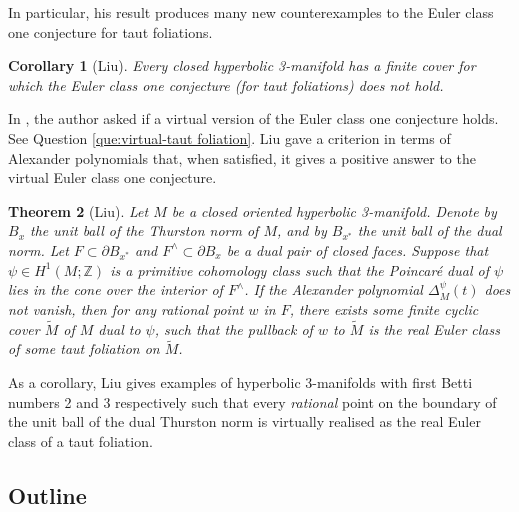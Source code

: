\documentclass[11pt]{amsart}
\newtheorem{thm}{Theorem}[section]
\newtheorem{cor}[thm]{Corollary}
\theoremstyle{remark}
\theoremstyle{definition}
\begin{document}
	In particular, his result produces many new counterexamples to the Euler class one conjecture for taut foliations.  
	
	\begin{cor}[Liu]
		Every closed hyperbolic 3-manifold has a finite cover for which the Euler class one conjecture (for taut foliations) does not hold. 
		\label{cor:Liu-taut-foliation}
	\end{cor} 

	In \cite{yazdi2020thurston}, the author asked if a virtual version of the Euler class one conjecture holds. See Question \ref{que:virtual-taut foliation}. Liu \cite{liu2024criterion} gave a criterion in terms of Alexander polynomials that, when satisfied, it gives a positive answer to the virtual Euler class one conjecture. 
	
	\begin{thm}[Liu]
		Let $M$ be a closed oriented hyperbolic 3-manifold. Denote by $B_x$ the unit ball of the Thurston norm of $M$, and by $B_{x^*}$ the unit ball of the dual norm. Let $F \subset \partial B_{x^*}$ and $F^\wedge \subset \partial B_{x}$ be a dual pair of closed faces. Suppose that $\psi \in H^1(M ; \mathbb{Z}) $ is a primitive cohomology class such that the Poincar\'{e} dual of $\psi$ lies in the cone over the interior of $F^\wedge$. 
		If the Alexander polynomial $\Delta_M^{\psi}(t)$ does not vanish, then for any rational point $w$ in $F$, there exists some finite cyclic cover $\tilde{M}$ of $M$ dual to $\psi$, such that the pullback of $w$ to $\tilde{M}$ is the real Euler class of some taut foliation on $\tilde{M}$.
		\label{thm: Liu-virtual-taut foliation}
	\end{thm}
	
	As a corollary, Liu gives examples of hyperbolic 3-manifolds with first Betti numbers 2 and 3 respectively such that every \emph{rational} point on the boundary of the unit ball of the dual Thurston norm is virtually realised as the real Euler class of a taut foliation.
	
	\subsection{Outline} 
	
\end{document}
